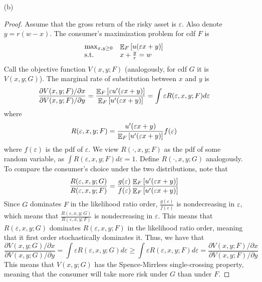 \documentclass[12pt]{article}
\begin{document}
\begin{itemize}
    \item[(b)] 
    \begin{proof}
    Assume that the gross return of the risky asset is $\varepsilon$. Also denote $y = r(w-x)$. The consumer's maximization problem for cdf $F$ is
    \[
    \begin{array}{ll}
        \max_{x,y \ge 0} & \mathop{\mathbb{E}}_F\left[ u(\varepsilon x + y)\right] \\
        \text{s.t.} & x + \frac{y}{r} = w
    \end{array}
    \]
    Call the objective function $V(x,y;F)$ (analogously, for cdf $G$ it is $V(x,y;G)$). The marginal rate of substitution between $x$ and $y$ is
    \[
    \frac{\partial V(x,y;F) / \partial x}{\partial V(x,y;F) / \partial y} = \frac{\mathop{\mathbb{E}}_F\left[ \varepsilon u'(\varepsilon x + y)\right]}{\mathop{\mathbb{E}}_F\left[ u'(\varepsilon x + y)\right]} = \int \varepsilon R(\varepsilon,x,y;F) d\varepsilon
    \]
    where
    \[
    R(\varepsilon,x,y;F) = \frac{u'(\varepsilon x + y)}{\mathop{\mathbb{E}}_F\left[ u'(\varepsilon x + y)\right]} f(\varepsilon)
    \]
    where $f(\varepsilon)$ is the pdf of $\varepsilon$. We view $R(\cdot,x,y;F)$ as the pdf of some random variable, as $\int R(\varepsilon,x,y;F) d\varepsilon = 1$. Define $R(\cdot,x,y;G)$ analogously. To compare the consumer's choice under the two distributions, note that
    \[
    \frac{R(\varepsilon,x,y;G)}{R(\varepsilon,x,y;F)} = \frac{g(\varepsilon)}{f(\varepsilon)} \frac{\mathop{\mathbb{E}}_F\left[ u'(\varepsilon x + y)\right]}{\mathop{\mathbb{E}}_F\left[ u'(\varepsilon x + y)\right]}
    \]
    Since $G$ dominates $F$ in the likelihood ratio order, $\frac{g(\varepsilon)}{f(\varepsilon)}$ is nondecreasing in $\varepsilon$, which means that $\frac{R(\varepsilon,x,y;G)}{R(\varepsilon,x,y;F)}$ is nondecreasing in $\varepsilon$. This means that $R(\varepsilon,x,y;G)$ dominates $R(\varepsilon,x,y;F)$ in the likelihood ratio order, meaning that it first order stochastically dominates it. Thus, we have that
    \[
    \frac{\partial V(x,y;G) / \partial x}{\partial V(x,y;G) / \partial y} = \int \varepsilon R(\varepsilon,x,y;G) d\varepsilon \ge \int \varepsilon R(\varepsilon,x,y;F) d\varepsilon = \frac{\partial V(x,y;F) / \partial x}{\partial V(x,y;F) / \partial y}
    \]
    This means that $V(x,y;G)$ has the Spence-Mirrlees single-crossing property, meaning that the consumer will take more risk under $G$ than under $F$.
    \end{proof}
\end{itemize}
\end{document}
